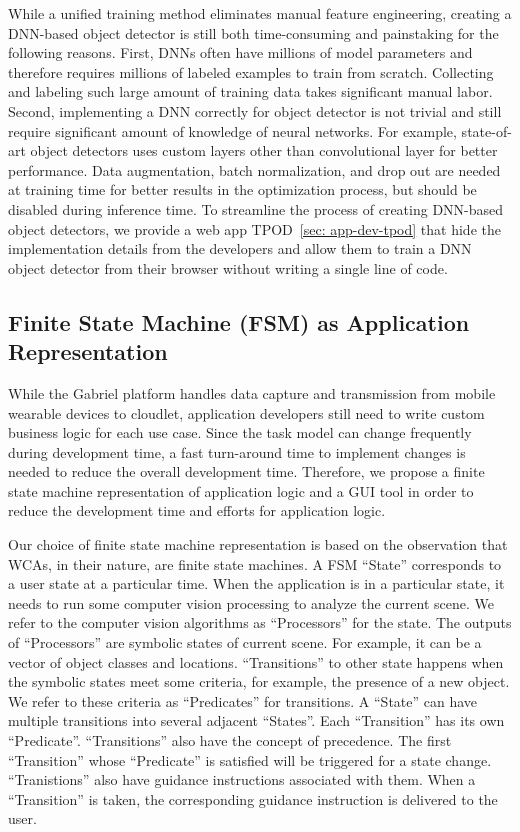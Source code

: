 While a unified training method eliminates manual feature engineering, creating
a DNN-based object detector is still both time-consuming and painstaking for the
following reasons. First, DNNs often have millions of model parameters and
therefore requires millions of labeled examples to train from scratch.
Collecting and labeling such large amount of training data takes significant
manual labor. Second, implementing a DNN correctly for object detector is not
trivial and still require significant amount of knowledge of neural networks.
For example, state-of-art object detectors uses custom layers other than
convolutional layer for better performance. Data augmentation, batch
normalization, and drop out are needed at training time for better results in
the optimization process, but should be disabled during inference time. To
streamline the process of creating DNN-based object detectors, we provide a web
app TPOD~\ref{sec: app-dev-tpod} that hide the implementation details from the
developers and allow them to train a DNN object detector from their browser
without writing a single line of code.

\subsection{Finite State Machine (FSM) as Application Representation}
\label{sec: app-dev-fsm-representation}

While the Gabriel platform handles data capture and transmission from mobile
wearable devices to cloudlet, application developers still need to write custom
business logic for each use case. Since the task model can change frequently
during development time, a fast turn-around time to implement changes is needed
to reduce the overall development time. Therefore, we propose a finite state
machine representation of application logic and a GUI tool in order to reduce
the development time and efforts for application logic. 

Our choice of finite state machine representation is based on the observation
that WCAs, in their nature, are finite state machines. A FSM ``State''
corresponds to a user state at a particular time. When the application is in a
particular state, it needs to run some computer vision processing to analyze the
current scene. We refer to the computer vision algorithms as ``Processors'' for
the state. The outputs of ``Processors'' are symbolic states of current scene.
For example, it can be a vector of object classes and locations. ``Transitions''
to other state happens when the symbolic states meet some criteria, for example,
the presence of a new object. We refer to these criteria as ``Predicates'' for
transitions. A ``State'' can have multiple transitions into several adjacent
``States''. Each ``Transition'' has its own ``Predicate''. ``Transitions'' also
have the concept of precedence. The first ``Transition'' whose ``Predicate'' is
satisfied will be triggered for a state change. ``Tranistions'' also have
guidance instructions associated with them. When a ``Transition'' is taken, the
corresponding guidance instruction is delivered to the user.


